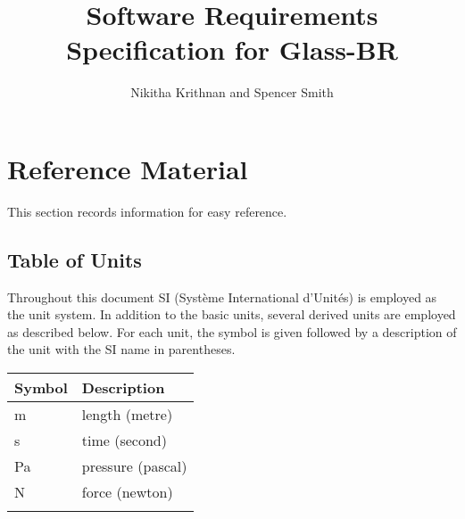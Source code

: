 \documentclass[12pt]{article}
\title{Software Requirements Specification for Glass-BR}
\author{Nikitha Krithnan and Spencer Smith}
\begin{document}
\maketitle
\tableofcontents
\newpage
\section{Reference Material}
\label{Sec:RM}
This section records information for easy reference.
\subsection{Table of Units}
\label{Sec:ToU}
Throughout this document SI (Syst\`{e}me International d'Unit\'{e}s) is employed as the unit system. In addition to the basic units, several derived units are employed as described below. For each unit, the symbol is given followed by a description of the unit with the SI name in parentheses.
\begin{longtable*}{l l}
\toprule
Symbol & Description
\\
\midrule
m & length (metre)
\\
s & time (second)
\\
Pa & pressure (pascal)
\\
N & force (newton)
\\
\bottomrule
\label{Table:ToU}
\end{longtable*}
\end{document}
